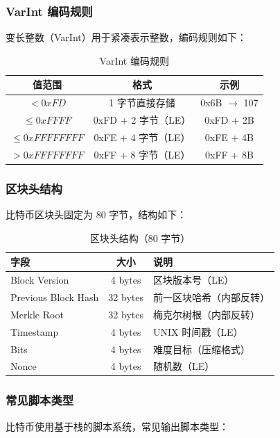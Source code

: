 \documentclass[12pt,a4paper]{ctexart}
\begin{document}
\subsubsection{VarInt 编码规则}
变长整数（VarInt）用于紧凑表示整数，编码规则如下：

\begin{table}[H]
\centering
\caption{VarInt 编码规则}
\begin{tabular}{|c|c|c|}
\hline
\textbf{值范围} & \textbf{格式} & \textbf{示例} \\
\hline
$< 0xFD$          & 1 字节直接存储          & 0x6B $\rightarrow$ 107 \\
$\leq 0xFFFF$     & 0xFD + 2 字节（LE）    & 0xFD + 2B \\
$\leq 0xFFFFFFFF$ & 0xFE + 4 字节（LE）    & 0xFE + 4B \\
$> 0xFFFFFFFF$    & 0xFF + 8 字节（LE）    & 0xFF + 8B \\
\hline
\end{tabular}
\end{table}

\subsubsection{区块头结构}
比特币区块头固定为 80 字节，结构如下：

\begin{table}[H]
\centering
\caption{区块头结构（80 字节）}
\begin{tabular}{|l|c|l|}
\hline
\textbf{字段} & \textbf{大小} & \textbf{说明} \\
\hline
Block Version      & 4 bytes  & 区块版本号（LE） \\
Previous Block Hash & 32 bytes & 前一区块哈希（内部反转） \\
Merkle Root        & 32 bytes & 梅克尔树根（内部反转） \\
Timestamp          & 4 bytes  & UNIX 时间戳（LE） \\
Bits               & 4 bytes  & 难度目标（压缩格式） \\
Nonce              & 4 bytes  & 随机数（LE） \\
\hline
\end{tabular}
\end{table}

\subsubsection{常见脚本类型}
比特币使用基于栈的脚本系统，常见输出脚本类型：
\end{document}
